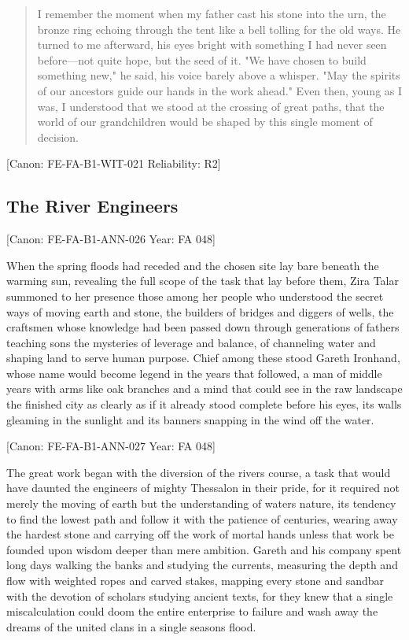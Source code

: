 \begin{quote}
I remember the moment when my father cast his stone into the urn, the
bronze ring echoing through the tent like a bell tolling for the old
ways. He turned to me afterward, his eyes bright with something I had
never seen before---not quite hope, but the seed of it. "We have chosen
to build something new," he said, his voice barely above a whisper. "May
the spirits of our ancestors guide our hands in the work ahead." Even
then, young as I was, I understood that we stood at the crossing of
great paths, that the world of our grandchildren would be shaped by this
single moment of decision.
\end{quote}

{[}Canon: FE-FA-B1-WIT-021 \textbar{} Reliability: R2{]}

\subsection{The River Engineers}\label{the-river-engineers}

{[}Canon: FE-FA-B1-ANN-026 \textbar{} Year: FA 048{]}

When the spring floods had receded and the chosen site lay bare beneath
the warming sun, revealing the full scope of the task that lay before
them, Zira Talar summoned to her presence those among her people who
understood the secret ways of moving earth and stone, the builders of
bridges and diggers of wells, the craftsmen whose knowledge had been
passed down through generations of fathers teaching sons the mysteries
of leverage and balance, of channeling water and shaping land to serve
human purpose. Chief among these stood Gareth Ironhand, whose name would
become legend in the years that followed, a man of middle years with
arms like oak branches and a mind that could see in the raw landscape
the finished city as clearly as if it already stood complete before his
eyes, its walls gleaming in the sunlight and its banners snapping in the
wind off the water.

{[}Canon: FE-FA-B1-ANN-027 \textbar{} Year: FA 048{]}

The great work began with the diversion of the river\textquotesingle s
course, a task that would have daunted the engineers of mighty Thessalon
in their pride, for it required not merely the moving of earth but the
understanding of water\textquotesingle s nature, its tendency to find
the lowest path and follow it with the patience of centuries, wearing
away the hardest stone and carrying off the work of mortal hands unless
that work be founded upon wisdom deeper than mere ambition. Gareth and
his company spent long days walking the banks and studying the currents,
measuring the depth and flow with weighted ropes and carved stakes,
mapping every stone and sandbar with the devotion of scholars studying
ancient texts, for they knew that a single miscalculation could doom the
entire enterprise to failure and wash away the dreams of the united
clans in a single season\textquotesingle s flood.

